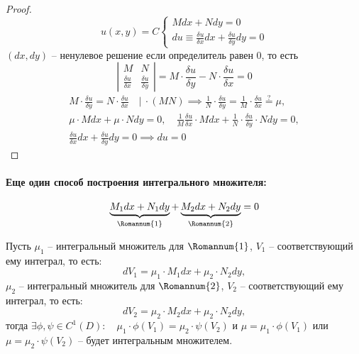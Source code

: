 \documentclass[11pt,a4paper,oneside]{report}
\theoremstyle{definition}
\theoremstyle{plain}
\theoremstyle{remark}
\begin{document}
\begin{proof}
    \begin{equation*}
        u(x,y) = C\left\{\begin{array}{l}
            Mdx + Ndy = 0 \\
            du \equiv \frac{\delta u}{\delta x}dx + \frac{\delta u}{\delta y}dy = 0
        \end{array}\right.
    \end{equation*}
    $(dx,dy)$ -- ненулевое решение если определитель равен 0, то есть
    \begin{equation*}
        \left|\begin{array}{cc}
            M                         & N                         \\
            \frac{\delta u}{\delta x} & \frac{\delta u}{\delta y}
        \end{array}\right| = M\cdot \frac{\delta u}{\delta y} - N\cdot \frac{\delta u}{\delta x} = 0
    \end{equation*}
    \begin{multline*}
        M\cdot \frac{\delta u}{\delta y} = N\cdot \frac{\delta u}{\delta x} \quad \bigg| \ \cdot (MN) \implies \frac{1}{N}\cdot \frac{\delta u}{\delta y} = \frac{1}{M} \cdot \frac{\delta u}{\delta x} \overset{?}{=} \mu, \\
        \mu \cdot Mdx + \mu \cdot Ndy = 0, \quad \frac{1}{M} \frac{\delta u}{\delta x} \cdot Mdx + \frac{1}{N} \cdot \frac{\delta u}{\delta y} \cdot Ndy = 0, \\
        \frac{\delta u}{\delta x}dx + \frac{\delta u}{\delta y}dy = 0 \implies du = 0
    \end{multline*}
\end{proof}

\paragraph*{Еще один способ построения интегрального множителя:}
\begin{equation*}
    \underbrace{M_1dx + N_1dy}_{\Romannum{1}} + \underbrace{M_2dx + N_2dy}_{\Romannum{2}} = 0
\end{equation*}

Пусть $\mu_1$ -- интегральный множитель для $\Romannum{1}$, $V_1$ -- соответствующий ему интеграл, то есть:
\begin{equation*}
    dV_1 = \mu_1 \cdot M_1 dx + \mu_2 \cdot N_2 dy,
\end{equation*}
$\mu_2$ -- интегральный множитель для $\Romannum{2}$, $V_2$ -- соответствующий ему интеграл, то есть:
\begin{equation*}
    dV_2 = \mu_2 \cdot M_2 dx + \mu_2 \cdot N_2 dy,
\end{equation*}
тогда $\exists \phi,\psi \in C^1(D): \quad \mu_1 \cdot \phi(V_1) = \mu_2 \cdot \psi(V_2)$ и $\mu = \mu_1 \cdot \phi (V_1)$ или $\mu = \mu_2 \cdot \psi(V_2)$ -- будет интегральным множителем.
\end{document}

